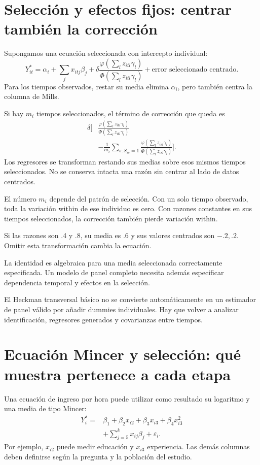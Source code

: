\documentclass[11pt,a4paper]{article}
\begin{document}
\clearpage
\section{Selección y efectos fijos: centrar también la corrección}\label{unidad172}
Supongamos una ecuación seleccionada
con intercepto individual:
\[
Y_{it}^\ast=\alpha_i+\sum_jx_{itj}\beta_j
+\delta\frac{\varphi(\sum_lz_{itl}\gamma_l)}
{\Phi(\sum_lz_{itl}\gamma_l)}
+\text{error seleccionado centrado}.
\]
Para los tiempos observados,
restar su media elimina
\(\alpha_i\), pero también
centra la columna de Mills.

Si hay \(m_i\) tiempos seleccionados,
el término de corrección que queda es
\[
\begin{aligned}
\delta\Bigg[
&\frac{\varphi(\sum_lz_{itl}\gamma_l)}
{\Phi(\sum_lz_{itl}\gamma_l)}\\
&-\frac1{m_i}\sum_{s:S_{is}=1}
\frac{\varphi(\sum_lz_{isl}\gamma_l)}
{\Phi(\sum_lz_{isl}\gamma_l)}
\Bigg].
\end{aligned}
\]
Los regresores se transforman
restando sus medias sobre
esos mismos tiempos seleccionados.
No se conserva intacta
una razón sin centrar
al lado de datos centrados.

El número \(m_i\) depende
del patrón de selección.
Con un solo tiempo observado,
toda la variación within
de ese individuo es cero.
Con razones constantes
en sus tiempos seleccionados,
la corrección también pierde
variación within.

\begin{ejemplo}
Si las razones son .4 y .8,
su media es .6
y sus valores centrados
son \(-.2,.2\).
Omitir esta transformación
cambia la ecuación.
\end{ejemplo}
La identidad es algebraica
para una media seleccionada
correctamente especificada.
Un modelo de panel completo
necesita además especificar
dependencia temporal y
efectos en la selección.

El Heckman transversal básico
no se convierte automáticamente
en un estimador de
panel válido por añadir
dummies individuales.
Hay que volver a
analizar identificación,
regresores generados y
covarianzas entre tiempos.

\clearpage
\section{Ecuación Mincer y selección: qué muestra pertenece a cada etapa}\label{unidad173}
Una ecuación de ingreso por hora
puede utilizar como resultado
su logaritmo y una media
de tipo Mincer:
\[
\begin{aligned}
Y_i^\ast={}&\beta_1+\beta_2x_{i2}
+\beta_3x_{i3}+\beta_4x_{i3}^2\\
&+\sum_{j=5}^kx_{ij}\beta_j+\varepsilon_i.
\end{aligned}
\]
Por ejemplo, \(x_{i2}\)
puede medir educación y
\(x_{i3}\) experiencia.
Las demás columnas deben
definirse según la pregunta
y la población del estudio.
\end{document}
